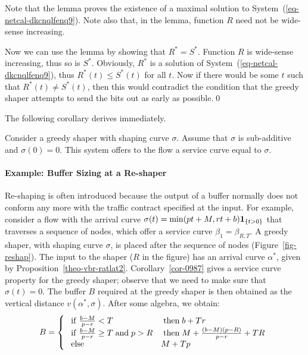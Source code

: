 Note that the lemma proves the existence of a maximal solution to
System~(\ref{eq-netcal-dkcnqlfenq9}). Note also that, in the
lemma, function $R$ need not be wide-sense increasing.

Now we can use the lemma by showing that $R^{*}= S^{*}$. Function
$R$ is wide-sense increasing, thus so is $S^*$. Obviously, $R^{*}$
is a solution of System~(\ref{eq-netcal-dkcnqlfenq9}), thus
$R^{*}(t) \leq S^{*}(t)$ for all $t$. Now if there would be some
$t$ such that $R^{*}(t) \neq S^{*}(t)$, then this would contradict
the condition that the greedy shaper attempts to send the bits out
as early as possible.\qed

The following corollary derives immediately.

\begin{corollary}
Consider a greedy shaper with shaping curve $\sigma$. Assume that
$\sigma$ is sub-additive and $\sigma(0)=0$. This system offers to
the flow a service curve equal to $\sigma$. 
\end{corollary}

\paragraph{Example: Buffer Sizing at a Re-shaper}
\begin{figure}[htbp]
\end{figure}
Re-shaping is often introduced because the output of a buffer
normally does not conform any more with the traffic contract
specified at the input. For example, consider a flow with the
arrival curve $\sigma(t) = \min(pt+M,rt+b)\mathbf{1}_{\{t>0\}}$ that traverses a
sequence of nodes, which offer a service curve
$\beta_1=\beta_{R,T}$. A greedy shaper, with shaping curve
$\sigma$, is placed after the sequence of nodes
(Figure~\ref{fig-reshap}). The input to the shaper ($R$ in the
figure) has an arrival curve $\alpha^*$, given by
Proposition~\ref{theo-vbr-ratlat2}. Corollary~\ref{cor-0987} gives
a service curve property for the greedy shaper; observe that we need to make sure that $\sigma(t)=0$.
The buffer
$B$ required at the greedy shaper is then obtained as the vertical distance
$v(\alpha^*,\sigma)$. After some algebra, we obtain:
\begin{equation}
B = \left\{
\begin{array}{ll}
    \mif \frac{b-M}{p-r}< T & \mthen  b +T r  \\
    \mif \frac{b-M}{p-r}\geq T \mand p > R  & \mthen  M +
    \frac{(b-M)(p-R)}{p-r} +T R \\
    \melse &  M + T p
\end{array}
\right.
    \mylabel{eq-d4-shap-jkcnui}
\end{equation}

